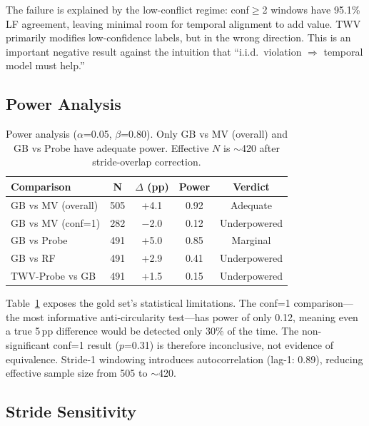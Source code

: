 \documentclass[11pt,a4paper]{article}
\begin{document}
The failure is explained by the low-conflict regime: conf$\geq$2 windows have 95.1\% LF agreement, leaving minimal room for temporal alignment to add value.
TWV primarily modifies low-confidence labels, but in the wrong direction.
This is an important negative result against the intuition that ``i.i.d.\ violation $\Rightarrow$ temporal model must help.''

\subsection{Power Analysis}
\label{sec:power}

\begin{table}[t]
\centering
\small
\begin{tabular}{lcccc}
\toprule
\textbf{Comparison} & \textbf{N} & \textbf{$\Delta$ (pp)} & \textbf{Power} & \textbf{Verdict} \\
\midrule
GB vs MV (overall) & 505 & +4.1 & 0.92 & Adequate \\
GB vs MV (conf=1) & 282 & $-$2.0 & 0.12 & Underpowered \\
GB vs Probe & 491 & +5.0 & 0.85 & Marginal \\
GB vs RF & 491 & +2.9 & 0.41 & Underpowered \\
TWV-Probe vs GB & 491 & +1.5 & 0.15 & Underpowered \\
\bottomrule
\end{tabular}
\caption{Power analysis ($\alpha$=0.05, $\beta$=0.80). Only GB vs MV (overall) and GB vs Probe have adequate power. Effective $N$ is $\sim$420 after stride-overlap correction.}
\label{tab:power}
\end{table}

Table~\ref{tab:power} exposes the gold set's statistical limitations.
The conf=1 comparison---the most informative anti-circularity test---has power of only 0.12, meaning even a true 5\,pp difference would be detected only 30\% of the time.
The non-significant conf=1 result ($p$=0.31) is therefore inconclusive, not evidence of equivalence.
Stride-1 windowing introduces autocorrelation (lag-1: 0.89), reducing effective sample size from 505 to $\sim$420.

\subsection{Stride Sensitivity}
\end{document}
